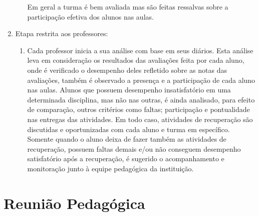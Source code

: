 \begin{enumerate}
\begin{enumerate}
Em geral a turma é bem avaliada mas são feitas ressalvas sobre a participação efetiva dos alunos nas aulas.
	\end{enumerate}
	\item Etapa restrita aos professores:
	\begin{enumerate}
		\item Cada professor inicia a sua análise com base em seus diários. Esta análise leva em consideração os resultados das avaliações feita por cada aluno, onde é verificado o desempenho deles refletido sobre as notas das avaliações, também é observado a presença e a participação de cada aluno nas aulas. Alunos que possuem desempenho insatisfatório em uma determinada disciplina, mas não nas outras, é ainda analisado, para efeito de comparação, outros critérios como faltas; participação e pontualidade nas entregas das atividades. Em todo caso, atividades de recuperação são discutidas e oportunizadas com cada aluno e turma em específico. Somente quando o aluno deixa de fazer também as atividades de recuperação, possuem faltas demais e/ou não conseguem desempenho satisfatório após a recuperação, é sugerido o acompanhamento e monitoração junto à equipe pedagógica da instituição.
	\end{enumerate}
\end{enumerate}
  


\section{Reunião Pedagógica}
